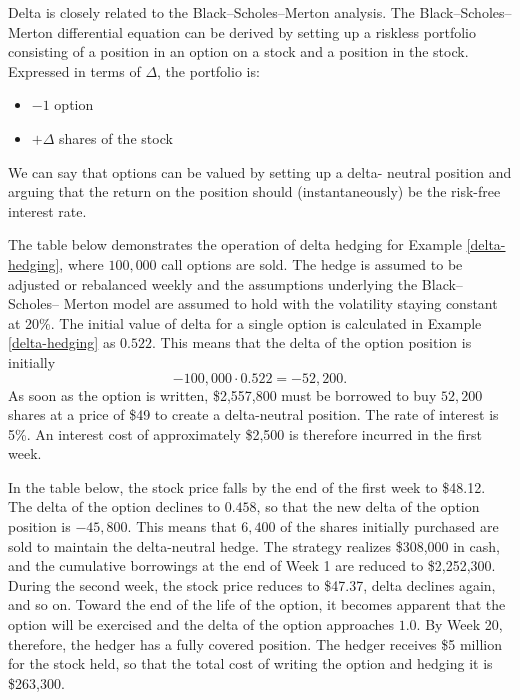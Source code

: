 \documentclass[letterpaper,10pt]{article}
\begin{document}
\noindent Delta is closely related to the Black–Scholes–Merton analysis. The Black–Scholes–Merton differential equation can be derived by setting
up a riskless portfolio consisting of a position in an option on a stock and a position in
the stock. Expressed in terms of $\Delta$, the portfolio is:

\begin{itemize}

\item $-1$ option

\item $+\Delta$ shares of the stock

\end{itemize}

We can say that options can be valued by setting up a delta-
neutral position and arguing that the return on the position should (instantaneously) be
the risk-free interest rate.

The table below demonstrates the operation of delta hedging for Example \ref{delta-hedging}, where $100,000$ call options are sold. The hedge is assumed to
be adjusted or rebalanced weekly and the assumptions underlying the Black–Scholes–
Merton model are assumed to hold with the volatility staying constant at 20\%. The
initial value of delta for a single option is calculated in Example \ref{delta-hedging} as $0.522$. This
means that the delta of the option position is initially $$-100,000 \cdot 0.522= -52,200.$$ As
soon as the option is written, \$2,557,800 must be borrowed to buy $52,200$ shares at a
price of \$49 to create a delta-neutral position. The rate of interest is 5\%. An interest
cost of approximately \$2,500 is therefore incurred in the first week.

In the table below, the stock price falls by the end of the first week to \$48.12. The delta of
the option declines to $0.458$, so that the new delta of the option position is $-45,800$. This
means that $6,400$ of the shares initially purchased are sold to maintain the delta-neutral
hedge. The strategy realizes \$308,000 in cash, and the cumulative borrowings at the end
of Week 1 are reduced to \$2,252,300. During the second week, the stock price reduces to
\$47.37, delta declines again, and so on. Toward the end of the life of the option, it
becomes apparent that the option will be exercised and the delta of the option
approaches $1.0$. By Week 20, therefore, the hedger has a fully covered position. The hedger receives \$5 million for the stock held, so that the total cost of writing the option
and hedging it is \$263,300.
\end{document}
